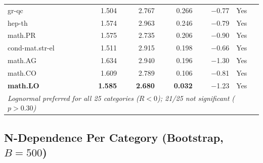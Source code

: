 \documentclass[11pt,letterpaper]{article}
\begin{document}
\begin{longtable}{lrrrrl}
gr-qc & 1.504 & 2.767 & 0.266 & $-$0.77 & Yes \\
hep-th & 1.574 & 2.963 & 0.246 & $-$0.79 & Yes \\
math.PR & 1.575 & 2.735 & 0.206 & $-$0.90 & Yes \\
cond-mat.str-el & 1.511 & 2.915 & 0.198 & $-$0.66 & Yes \\
math.AG & 1.634 & 2.940 & 0.196 & $-$1.30 & Yes \\
math.CO & 1.609 & 2.789 & 0.106 & $-$0.81 & Yes \\
\textbf{math.LO} & \textbf{1.585} & \textbf{2.680} & \textbf{0.032} & $-$1.23 & Yes \\
\midrule
\multicolumn{6}{l}{\textit{Lognormal preferred for all 25
categories ($R < 0$); 21/25 not significant ($p > 0.30$)}} \\
\bottomrule
\end{longtable}


\subsection{N-Dependence Per Category (Bootstrap, $B = 500$)}
\end{document}
